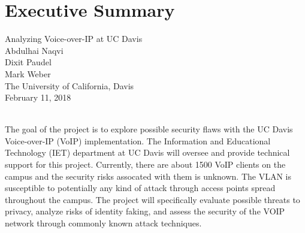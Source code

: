 \section{Executive Summary}


\begin{centering}  
Analyzing Voice-over-IP at UC Davis \\
Abdulhai Naqvi \\
Dixit Paudel \\
Mark Weber \\
The University of California, Davis \\
February 11, 2018  \\~\\
\end{centering}  

The goal of the project is to explore possible security flaws with the UC Davis Voice-over-IP (VoIP) implementation. The Information and Educational Technology (IET) department at UC Davis will oversee and provide technical support for this project. Currently, there are about 1500 VoIP clients on the campus and the security risks assocated with them is unknown. The VLAN is susceptible to potentially any kind of attack through access points spread throughout the campus. The project will specifically evaluate possible threats to privacy, analyze risks of identity faking, and assess the security of the VOIP network through commonly known attack techniques.

